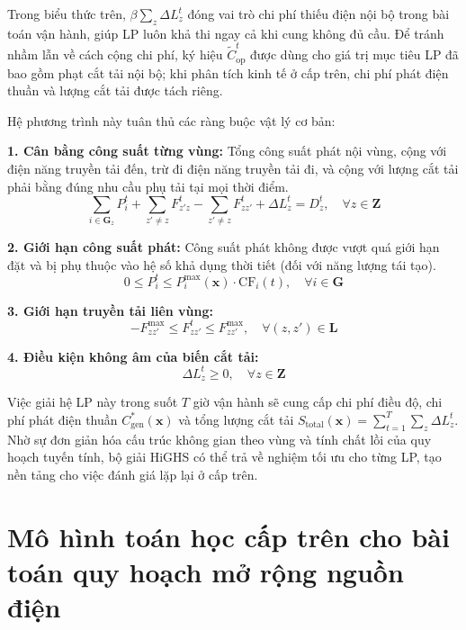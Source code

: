 Trong biểu thức trên, $\beta \sum_z \Delta L_z^t$ đóng vai trò chi phí thiếu điện nội bộ trong bài toán vận hành, giúp LP luôn khả thi ngay cả khi cung không đủ cầu. Để tránh nhầm lẫn về cách cộng chi phí, ký hiệu $\tilde{C}_{\text{op}}^t$ được dùng cho giá trị mục tiêu LP đã bao gồm phạt cắt tải nội bộ; khi phân tích kinh tế ở cấp trên, chi phí phát điện thuần và lượng cắt tải được tách riêng.

Hệ phương trình này tuân thủ các ràng buộc vật lý cơ bản:

\textbf{1. Cân bằng công suất từng vùng:}
Tổng công suất phát nội vùng, cộng với điện năng truyền tải đến, trừ đi điện năng truyền tải đi, và cộng với lượng cắt tải phải bằng đúng nhu cầu phụ tải tại mọi thời điểm.
\begin{equation}
    \sum_{i \in \mathbf{G}_z} P_i^t + \sum_{z' \ne z} F_{z'z}^t - \sum_{z' \ne z} F_{zz'}^t + \Delta L_z^t = D_z^t, \quad \forall z \in \mathbf{Z}
\end{equation}

\textbf{2. Giới hạn công suất phát:}
Công suất phát không được vượt quá giới hạn đặt và bị phụ thuộc vào hệ số khả dụng thời tiết (đối với năng lượng tái tạo).
\begin{equation}
    0 \leq P_i^t \leq P_i^{\max}(\mathbf{x}) \cdot \text{CF}_i(t), \quad \forall i \in \mathbf{G}
\end{equation}

\textbf{3. Giới hạn truyền tải liên vùng:}
\begin{equation}
    -F_{zz'}^{\max} \leq F_{zz'}^t \leq F_{zz'}^{\max}, \quad \forall (z, z') \in \mathbf{L}
\end{equation}

\textbf{4. Điều kiện không âm của biến cắt tải:}
\begin{equation}
    \Delta L_z^t \geq 0, \quad \forall z \in \mathbf{Z}
\end{equation}

Việc giải hệ LP này trong suốt $T$ giờ vận hành sẽ cung cấp chi phí điều độ, chi phí phát điện thuần $C_{\text{gen}}^*(\mathbf{x})$ và tổng lượng cắt tải $S_{\text{total}}(\mathbf{x}) = \sum_{t=1}^T \sum_z \Delta L_z^t$. Nhờ sự đơn giản hóa cấu trúc không gian theo vùng và tính chất lồi của quy hoạch tuyến tính, bộ giải HiGHS \cite{huangfu2018highs} có thể trả về nghiệm tối ưu cho từng LP, tạo nền tảng cho việc đánh giá lặp lại ở cấp trên.

\section{Mô hình toán học cấp trên cho bài toán quy hoạch mở rộng nguồn điện}

